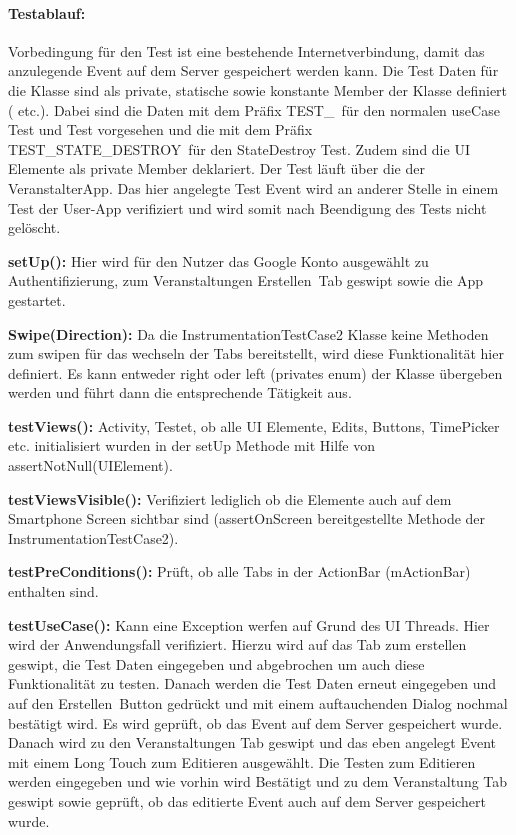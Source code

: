 \paragraph{Testablauf:}
Vorbedingung für den Test ist eine bestehende Internetverbindung, damit das anzulegende Event auf dem Server gespeichert werden kann.
Die Test Daten für die Klasse sind als private, statische sowie konstante Member der Klasse definiert ( etc.). Dabei sind die Daten mit dem Präfix \glqq TEST\_\grqq\ für den normalen useCase Test und  Test vorgesehen und die mit dem Präfix \glqq TEST\_STATE\_DESTROY\grqq\ für den StateDestroy Test. Zudem sind die UI Elemente als private Member deklariert.
Der Test läuft über die  der \glqq VeranstalterApp\grqq. Das hier angelegte Test Event wird an anderer Stelle in einem Test der User-App   verifiziert und wird somit nach Beendigung des Tests nicht gelöscht.

\textbf{setUp():} Hier wird für den Nutzer das Google Konto ausgewählt zu Authentifizierung, zum \glqq Veranstaltungen Erstellen\grqq\ Tab geswipt sowie die App gestartet.

\textbf{Swipe(Direction):} Da die InstrumentationTestCase2 Klasse keine Methoden zum swipen für das wechseln der Tabs bereitstellt, wird diese Funktionalität hier definiert. Es kann entweder right oder left (privates enum) der Klasse übergeben werden und führt dann die entsprechende Tätigkeit aus.

\textbf{testViews():} Activity, Testet, ob alle UI Elemente, Edits, Buttons, TimePicker etc. initialisiert wurden in der setUp Methode mit Hilfe von assertNotNull(UIElement).

\textbf{testViewsVisible():} Verifiziert lediglich ob die Elemente auch auf dem Smartphone Screen sichtbar sind (assertOnScreen bereitgestellte Methode der InstrumentationTestCase2).

\textbf{testPreConditions():} Prüft, ob alle Tabs in der ActionBar (mActionBar) enthalten sind.

\textbf{testUseCase():} Kann eine Exception werfen auf Grund des UI Threads. Hier wird der Anwendungsfall verifiziert. Hierzu wird auf das Tab zum erstellen geswipt, die Test Daten eingegeben und abgebrochen um auch diese Funktionalität zu testen. Danach werden die Test Daten erneut eingegeben und auf den \glqq Erstellen\grqq\ Button gedrückt und mit einem auftauchenden Dialog nochmal bestätigt wird. Es wird geprüft, ob das Event auf dem Server gespeichert wurde. Danach wird zu den Veranstaltungen Tab geswipt und das eben angelegt Event mit einem Long Touch zum Editieren ausgewählt. Die Testen zum Editieren werden eingegeben und wie vorhin wird Bestätigt und zu dem Veranstaltung Tab geswipt sowie geprüft, ob das editierte Event auch auf dem Server gespeichert wurde.

